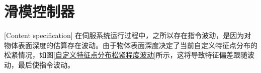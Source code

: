 \documentclass[fontset=fandol,type=bachelor,campus=harbin,bsmainpagenumberline=true]{hithesisbook}
\begin{document}
\section{滑模控制器}[Content specification]
在伺服系统运行过程中，之所以存在指令波动，是因为对物体表面深度的估算存在波动。由于物体表面深度决定了当前自定义特征点分布的松紧情况，如图\ref{自定义特征点分布松紧程度波动}所示，这将导致特征偏差跟随波动，最后使指令波动。
\begin{figure}[h]
	\centering
\end{figure}
\end{document}
